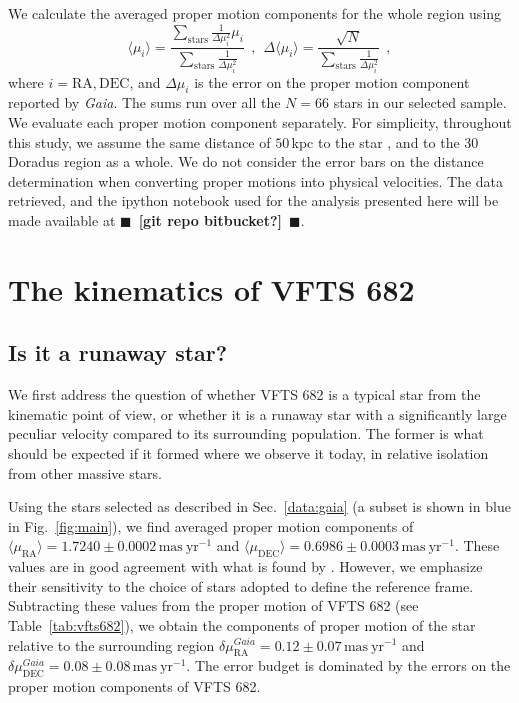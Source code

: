 \documentclass[apjl,twocolumn]{emulateapj}
\newcommand{\todo}[1]{{\large $\blacksquare$~\textbf{\color{red}[#1]}}~$\blacksquare$}
\DeclareRobustCommand{\Figref}[1]{Fig.~\ref{#1}}
\DeclareRobustCommand{\Tabref}[1]{Table~\ref{#1}}
\DeclareRobustCommand{\Secref}[1]{Sec.~\ref{#1}}
\begin{document}
We calculate the averaged proper motion components for the whole
region using 
\begin{equation}
  \label{eq:mean}
  \langle \mu_i\rangle = \frac{\sum_\mathrm{stars}\frac{1}{\Delta
      \mu_i^2}\mu_i}{\sum_\mathrm{stars} \frac{1}{\Delta \mu_i^2}} \ \ , \
  \ \Delta \langle \mu_i\rangle = \frac{\sqrt{N}}{\sum_\mathrm{stars}
    \frac{1}{\Delta \mu_i^2}} \ \ ,
\end{equation}
where $i = \mathrm{RA}, \mathrm{DEC}$, and $\Delta \mu_i$ is the error
on the proper motion component reported by \emph{Gaia}. The sums run over
all the $N=66$ stars in our selected sample. We evaluate each proper motion
component separately. For simplicity, throughout this study, we assume the same
distance of $50$\,kpc to the star \citep[][]{pietrzynski:13}, and to
the 30 Doradus region as a whole. We do not consider the error bars on
the distance determination when converting proper motions into
physical velocities. The data retrieved, and the ipython notebook used for the analysis
presented here will be made available at \todo{git repo bitbucket?}. 

\section{The kinematics of VFTS 682}
\label{sec:results}

\subsection{Is it a runaway star?}
\label{sec:runaway}
We first address the question of whether VFTS 682 is a typical star
from the kinematic point of view, or whether it is a runaway star with
a significantly large peculiar velocity compared to its surrounding population. The former is what should
be expected if it formed where we observe it today, in relative
isolation from other massive stars.

Using the stars selected as described in \Secref{data:gaia} (a
subset is shown in blue in \Figref{fig:main}), we find averaged proper motion components of
$\langle\mu_\mathrm{RA}\rangle = 1.7240\pm0.0002\,\mathrm{mas\ yr^{-1}}$ and
$\langle\mu_\mathrm{DEC}\rangle = 0.6986\pm0.0003\,\mathrm{mas\
  yr^{-1}}$. These values are
in good agreement with what is found by \cite{lennon:18}. However, we
emphasize their sensitivity to the choice of stars adopted to define
the reference frame. Subtracting these values from the
proper motion of VFTS 682 (see \Tabref{tab:vfts682}), we obtain the
components of proper motion of the star relative to the surrounding region
$\delta\mu_\mathrm{RA}^{Gaia} = 0.12\pm 0.07\,\mathrm{mas\ yr^{-1}}$ and $\delta\mu_\mathrm{DEC}^{Gaia} =
0.08\pm 0.08\,\mathrm{mas\ yr^{-1}}$. The error budget is
dominated by the errors on the proper motion components of VFTS 682.
\end{document}
